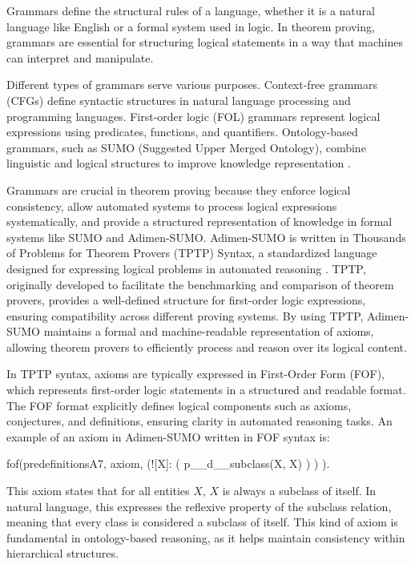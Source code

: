 \documentclass[english,version-2020-11]{uzl-thesis}
\begin{document}
Grammars define the structural rules of a language, whether it is a natural language like English or a formal system used in logic. In theorem proving, grammars are essential for structuring logical statements in a way that machines can interpret and manipulate.

Different types of grammars serve various purposes. Context-free grammars (CFGs) define syntactic structures in natural language processing and programming languages. First-order logic (FOL) grammars represent logical expressions using predicates, functions, and quantifiers. Ontology-based grammars, such as SUMO (Suggested Upper Merged Ontology), combine linguistic and logical structures to improve knowledge representation \cite{Niles2001}.

Grammars are crucial in theorem proving because they enforce logical consistency, allow automated systems to process logical expressions systematically, and provide a structured representation of knowledge in formal systems like SUMO and Adimen-SUMO. Adimen-SUMO is written in Thousands of Problems for Theorem Provers (TPTP) Syntax, a standardized language designed for expressing logical problems in automated reasoning \cite{Alvez2014}. TPTP, originally developed to facilitate the benchmarking and comparison of theorem provers, provides a well-defined structure for first-order logic expressions, ensuring compatibility across different proving systems. By using TPTP, Adimen-SUMO maintains a formal and machine-readable representation of axioms, allowing theorem provers to efficiently process and reason over its logical content.

In TPTP syntax, axioms are typically expressed in First-Order Form (FOF), which represents first-order logic statements in a structured and readable format. The FOF format explicitly defines logical components such as axioms, conjectures, and definitions, ensuring clarity in automated reasoning tasks. An example of an axiom in Adimen-SUMO written in FOF syntax is:


\begin{Pseudocode}[morekeywords = {add, create}, deletekeywords={to}, numbers=left,
    caption = {Axiom example Adimen-SUMO}]
    fof(predefinitionsA7, axiom,
        (![X]: 
            (
                p__d__subclass(X, X)
            )
        )
    ).
\end{Pseudocode}

This axiom states that for all entities \( X \), \( X \) is always a subclass of itself. In natural language, this expresses the reflexive property of the subclass relation, meaning that every class is considered a subclass of itself. This kind of axiom is fundamental in ontology-based reasoning, as it helps maintain consistency within hierarchical structures.
\end{document}
